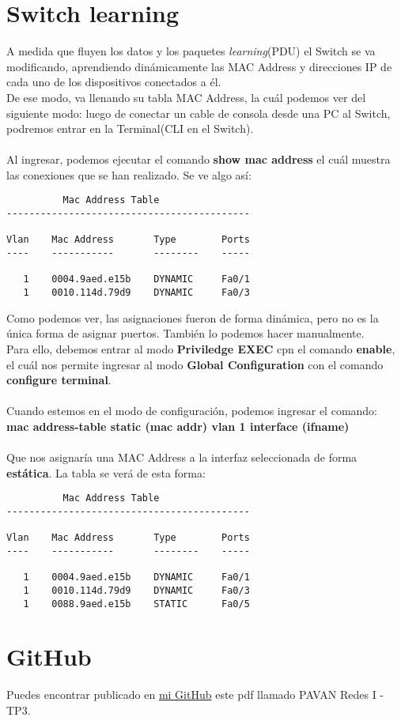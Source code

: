 \documentclass{article}
\begin{document}
\section{Switch learning}
A medida que fluyen los datos y los paquetes \textit{learning}(PDU) el Switch se va modificando, aprendiendo dinámicamente las MAC Address y direcciones IP de cada uno de los dispositivos conectados a él.
\\
De ese modo, va llenando su tabla MAC Address, la cuál podemos ver del siguiente modo: luego de conectar un cable de consola desde una PC al Switch, podremos entrar en la Terminal(CLI en el Switch).
\\\\
Al ingresar, podemos ejecutar el comando \textbf{show mac address} el cuál muestra las conexiones que se han realizado. Se ve algo así:
\begin{lstlisting}
          Mac Address Table
-------------------------------------------

Vlan    Mac Address       Type        Ports
----    -----------       --------    -----

   1    0004.9aed.e15b    DYNAMIC     Fa0/1
   1    0010.114d.79d9    DYNAMIC     Fa0/3
\end{lstlisting}
Como podemos ver, las asignaciones fueron de forma dinámica, pero no es la única forma de asignar puertos. También lo podemos hacer manualmente.
\\
Para ello, debemos entrar al modo \textbf{Priviledge EXEC} cpn el comando \textbf{enable}, el cuál nos permite ingresar al modo \textbf{Global Configuration} con el comando \textbf{configure terminal}.
\\\\
Cuando estemos en el modo de configuración, podemos ingresar el comando:\\ 
\textbf{mac address-table static (mac addr) vlan 1 interface (ifname)}
\\\\
Que nos asignaría una MAC Address a la interfaz seleccionada de forma \textbf{estática}. La tabla se verá de esta forma: 
\begin{lstlisting}
          Mac Address Table
-------------------------------------------

Vlan    Mac Address       Type        Ports
----    -----------       --------    -----

   1    0004.9aed.e15b    DYNAMIC     Fa0/1
   1    0010.114d.79d9    DYNAMIC     Fa0/3
   1    0088.9aed.e15b    STATIC      Fa0/5
\end{lstlisting}
\section{GitHub}
Puedes encontrar publicado en \href{https://github.com/martinpavan1/redes1}{mi GitHub} este pdf llamado PAVAN Redes I - TP3.
\end{document}
